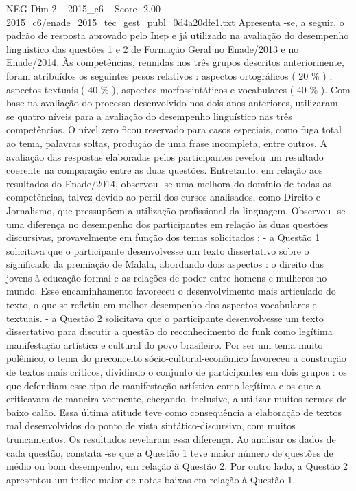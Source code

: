 \begin{textsample}{NEG Dim 2 – 2015\_c6 – Score -2.00 – 2015\_c6/enade\_2015\_tec\_gest\_publ\_0d4a20dfe1.txt}
Apresenta -se, a seguir, o padrão de resposta aprovado pelo Inep e já utilizado na avaliação do desempenho linguístico das questões 1 e 2 de Formação Geral no Enade/2013 e no Enade/2014.
Às competências, reunidas nos três grupos descritos anteriormente, foram atribuídos os seguintes pesos relativos : aspectos ortográficos ( 20 \% ) ; aspectos textuais ( 40 \% ), aspectos morfossintáticos e vocabulares ( 40 \% ).
Com base na avaliação do processo desenvolvido nos dois anos anteriores, utilizaram -se quatro níveis para a avaliação do desempenho linguístico nas três competências.
O nível zero ficou reservado para casos especiais, como fuga total ao tema, palavras soltas, produção de uma frase incompleta, entre outros.
A avaliação das respostas elaboradas pelos participantes revelou um resultado coerente na comparação entre as duas questões.
Entretanto, em relação aos resultados do Enade/2014, observou -se uma melhora do domínio de todas as competências, talvez devido ao perfil dos cursos analisados, como Direito e Jornalismo, que pressupõem a utilização profissional da linguagem.
Observou -se uma diferença no desempenho dos participantes em relação às duas questões discursivas, provavelmente em função dos temas solicitados : - a Questão 1 solicitava que o participante desenvolvesse um texto dissertativo sobre o significado da premiação de Malala, abordando dois aspectos : o direito das jovens à educação formal e as relações de poder entre homens e mulheres no mundo.
Esse encaminhamento favoreceu o desenvolvimento mais articulado do texto, o que se refletiu em melhor desempenho dos aspectos vocabulares e textuais. - a Questão 2 solicitava que o participante desenvolvesse um texto dissertativo para discutir a questão do reconhecimento do funk como legítima manifestação artística e cultural do povo brasileiro.
Por ser um tema muito polêmico, o tema do preconceito sócio-cultural-econômico favoreceu a construção de textos mais críticos, dividindo o conjunto de participantes em dois grupos : os que defendiam esse tipo de manifestação artística como legítima e os que a criticavam de maneira veemente, chegando, inclusive, a utilizar muitos termos de baixo calão.
Essa última atitude teve como consequência a elaboração de textos mal desenvolvidos do ponto de vista sintático-discursivo, com muitos truncamentos.
Os resultados revelaram essa diferença.
Ao analisar os dados de cada questão, constata -se que a Questão 1 teve maior número de questões de médio ou bom desempenho, em relação à Questão 2.
Por outro lado, a Questão 2 apresentou um índice maior de notas baixas em relação à Questão 1.

\end{textsample}

